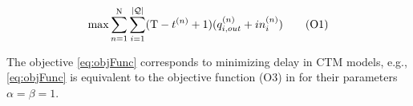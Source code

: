 \begin{equation}
\max 
 \sum_{n=1}^{\mathrm{N}} \sum_{i=1}^{|\mathcal{\mathcal{Q}}|} (\mathrm{T} - t^{(n)} + 1) (q_{i,out}^{(n)} + in_{i}^{(n)})
\tag{O1}\label{eq:objFunc}
\end{equation}




The objective \eqref{eq:objFunc} corresponds to minimizing delay in CTM models,
e.g., \eqref{eq:objFunc} is equivalent to the objective function (O3) in
 for their parameters $\alpha = \beta = 1$.
%
%








